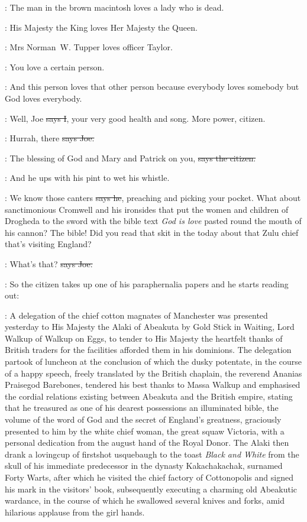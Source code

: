 :
The man in the brown macintosh loves a lady who is dead.

:
His Majesty the King loves Her Majesty the Queen.

:
Mrs Norman~W. Tupper loves officer Taylor.

:
You love a certain person.

:
And this person loves that other person because everybody loves somebody
but God loves everybody.

:
Well,
Joe
\sout{says I},
your very good health and song.
More power,
citizen.

\joe:
Hurrah,
there
\sout{says Joe.}

\citizen:
The blessing of God and Mary and Patrick on you,
\sout{says the citizen.}

\Nq:
And he ups with his pint to wet his whistle.

\citizen:
We know those canters
\sout{says he},
preaching and picking your pocket.
What about sanctimonious Cromwell and his ironsides that put the women
and children of Drogheda to the sword with the bible text \emph{God is love}
pasted round the mouth of his cannon?
The bible!
Did you read that skit in the  today
about that Zulu chief that's visiting England?

\joe:
What's that?
\sout{says Joe.}

\Nq:
So the citizen takes up one of his paraphernalia papers and he starts reading out:

\citizen:
A delegation of the chief cotton magnates of Manchester was presented
yesterday to His Majesty the Alaki of Abeakuta by Gold Stick in Waiting,
Lord Walkup of Walkup on Eggs,
to tender to His Majesty
the heartfelt thanks of British traders
for the facilities afforded them in his dominions.
The delegation partook of luncheon at the conclusion
of which the dusky potentate,
in the course of a happy speech,
freely translated by the British chaplain,
the reverend Ananias Praisegod Barebones,
tendered his best thanks to Massa Walkup
and emphasised the cordial relations existing between Abeakuta and the British empire,
stating that he treasured as one of his dearest possessions an illuminated bible,
the volume of the word of God
and the secret of England's greatness,
graciously presented to him by the white chief woman,
the great squaw Victoria,
with a personal dedication from the august hand of the Royal Donor.
The Alaki then drank a lovingcup of firstshot usquebaugh
to the toast \emph{Black and White}
from the skull of his immediate predecessor
in the dynasty Kakachakachak,
surnamed Forty Warts,
after which he visited the chief factory of Cottonopolis
and signed his mark in the visitors' book,
subsequently executing a charming old Abeakutic wardance,
in the course of which he swallowed several knives and forks,
amid hilarious applause from the girl hands.

